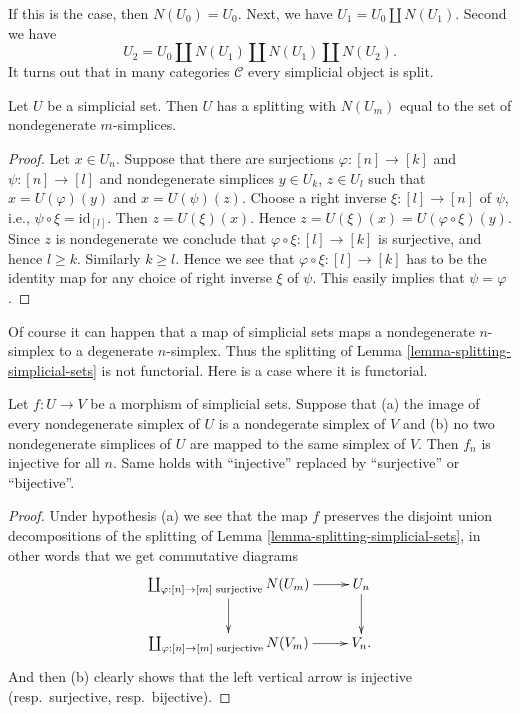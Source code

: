 \noindent
If this is the case, then $N(U_0) = U_0$. Next, we have
$U_1 = U_0 \coprod N(U_1)$. Second we have
$$
U_2 = U_0 \coprod N(U_1) \coprod N(U_1) \coprod N(U_2).
$$
It turns out that in many categories $\mathcal{C}$
every simplicial object is split.

\begin{lemma}
\label{lemma-splitting-simplicial-sets}
Let $U$ be a simplicial set.
Then $U$ has a splitting
with $N(U_m)$ equal to the set of
nondegenerate $m$-simplices.
\end{lemma}

\begin{proof}
Let $x \in U_n$. Suppose that
there are surjections $\varphi : [n] \to [k]$
and $\psi : [n] \to [l]$ and nondegenerate simplices
$y \in U_k$, $z \in U_l$ such that $x = U(\varphi)(y)$
and $x = U(\psi)(z)$. Choose a right inverse $\xi : [l] \to [n]$
of $\psi$, i.e., $\psi \circ \xi = \text{id}_{[l]}$.
Then $z = U(\xi)(x)$. Hence $z = U(\xi)(x) = U(\varphi \circ \xi)(y)$.
Since $z$ is nondegenerate we conclude that $\varphi \circ \xi :
[l] \to [k]$ is surjective, and hence $l \geq k$. Similarly
$k \geq l$. Hence we see that $\varphi \circ \xi : [l] \to [k]$
has to be the identity map for any choice of right inverse
$\xi$ of $\psi$. This easily implies that $\psi = \varphi$.
\end{proof}

\noindent
Of course it can happen that a map of simplicial sets
maps a nondegenerate $n$-simplex to a degenerate $n$-simplex.
Thus the splitting of Lemma \ref{lemma-splitting-simplicial-sets}
is not functorial. Here is a case where it is functorial.

\begin{lemma}
\label{lemma-injective-map-simplicial-sets}
Let $f : U \to V$ be a morphism of simplicial sets.
Suppose that (a) the image of every nondegenerate simplex of
$U$ is a nondegerate simplex of $V$ and (b)
no two nondegenerate simplices of $U$ are mapped
to the same simplex of $V$.
Then $f_n$ is injective for all $n$.
Same holds with ``injective'' replaced by
``surjective'' or ``bijective''.
\end{lemma}

\begin{proof}
Under hypothesis (a) we see that the map $f$ preserves
the disjoint union decompositions of the splitting
of Lemma \ref{lemma-splitting-simplicial-sets}, in other words
that we get commutative diagrams
$$
\xymatrix{
\coprod\nolimits_{\varphi : [n] \to [m]\text{ surjective}}
N(U_m)
\ar[r] \ar[d] &
U_n \ar[d] \\
\coprod\nolimits_{\varphi : [n] \to [m]\text{ surjective}}
N(V_m)
\ar[r] &
V_n.
}
$$
And then (b) clearly shows that the left vertical arrow is
injective (resp.\ surjective, resp.\ bijective).
\end{proof}

